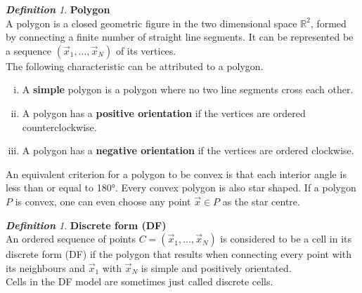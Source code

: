 \documentclass[a4paper,12pt,leqno]{article}
\theoremstyle{plain}
\theoremstyle{remark}
\newtheorem{definition}[theorem]{\bf Definition}
\newcommand{\R}{\mathbb{R}}
\begin{document}
\begin{definition} \textbf{Polygon} \\
	A polygon is a closed geometric figure in the two dimensional space $\R^2$, formed by connecting a finite number of straight line segments. It can be represented be a sequence $(\vec{x}_1, \ldots, \vec{x}_N)$ of its vertices. \\
	The following characteristic can be attributed to a polygon.
	\begin{enumerate}[(i)]
		\item A \textbf{simple} polygon is a polygon where no two line segments cross each other.
		\item A polygon has a \textbf{positive orientation} if the vertices are ordered counterclockwise.
		\item A polygon has a \textbf{negative orientation} if the vertices are ordered clockwise.
	\end{enumerate}
\end{definition}
An equivalent criterion for a polygon to be convex is that each interior angle is less than or equal to 180°. Every convex polygon is also star shaped. If a polygon $P$ is convex, one can even choose any point $\vec{x} \in P$ as the star centre. \\
\begin{definition} \textbf{Discrete form (DF)} \label{def:DF}  \\
	An ordered sequence of points $C = (\vec{x}_1, \ldots , \vec{x}_N)$ is considered to be a cell in its discrete form (DF) if the polygon that results when connecting every point with its neighbours and $\vec{x}_1$ with $\vec{x}_N$ is simple and positively orientated. \\	
	Cells in the DF model are sometimes just called discrete cells. \\
\end{definition}
\end{document}
